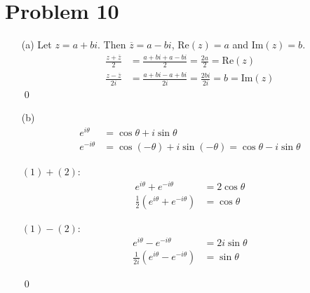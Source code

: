 \documentclass{article}
\renewcommand{\Re}{{\mathrm{Re}}}
\renewcommand{\Im}{{\mathrm{Im}}}
\begin{document}
\section*{Problem 10}
\begin{itemize}
\item[(a)]
	Let $z=a+bi$. Then $\overline{z}=a-bi$, $\Re(z)=a$ and $\Im(z)=b$.
	\begin{align*}
		\frac{z+\overline{z}}{2}&=\frac{a+bi+a-bi}{2}=\frac{2a}{2}=\Re(z) \\
		\frac{z-\overline{z}}{2i}&=\frac{a+bi-a+bi}{2i}=\frac{2bi}{2i}=b=\Im(z)
	\end{align*}
	\qed

\item[(b)]
	\begin{align}
		e^{i\theta}&=\cos\theta+i\sin\theta \\
		e^{-i\theta}&=\cos(-\theta)+i\sin(-\theta)=\cos\theta-i\sin\theta
	\end{align}
	\begin{minipage}[t]{0.5\linewidth}
		$(1)+(2)$:
		\begin{align*}
			e^{i\theta}+e^{-i\theta}&=2\cos\theta \\
			\frac{1}{2}\left(e^{i\theta}+e^{-i\theta}\right)&=\cos\theta
		\end{align*}
	\end{minipage}
	\begin{minipage}[t]{0.5\linewidth}
		$(1)-(2)$:
		\begin{align*}
			e^{i\theta}-e^{-i\theta}&=2i\sin\theta \\
			\frac{1}{2i}\left(e^{i\theta}-e^{-i\theta}\right)&=\sin\theta
		\end{align*}
	\end{minipage}
	\qed


\end{itemize}
\end{document}

